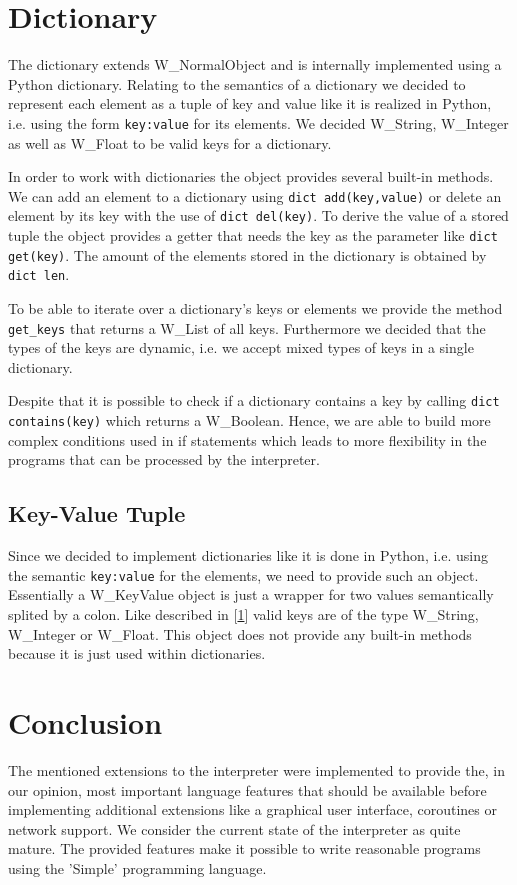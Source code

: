 \documentclass{article}
\begin{document}
\section{Dictionary}
\label{dicts}
The dictionary extends W\_NormalObject and is internally implemented using a Python dictionary.
Relating to the semantics of a dictionary we decided to represent each element as a tuple of key and value like it is realized in Python, i.e. using the form \texttt{key:value} for its elements.
We decided W\_String, W\_Integer as well as W\_Float to be valid keys for a dictionary.

In order to work with dictionaries the object provides several built-in methods.
We can add an element to a dictionary using \texttt{dict add(key,value)} or delete an element by its key with the use of \texttt{dict del(key)}.
To derive the value of a stored tuple the object provides a getter that needs the key as the parameter like \texttt{dict get(key)}.
The amount of the elements stored in the dictionary is obtained by \texttt{dict len}.

To be able to iterate over a dictionary's keys or elements we provide the method \texttt{get\_keys} that returns a W\_List of all keys.
Furthermore we decided that the types of the keys are dynamic, i.e. we accept mixed types of keys in a single dictionary.

Despite that it is possible to check if a dictionary contains a key by calling \texttt{dict contains(key)} which returns a W\_Boolean.
Hence, we are able to build more complex conditions used in if statements which leads to more flexibility in the programs that can be processed by the interpreter.

\subsection{Key-Value Tuple}
Since we decided to implement dictionaries like it is done in Python, i.e. using the semantic \texttt{key:value} for the elements, we need to provide such an object.
Essentially a W\_KeyValue object is just a wrapper for two values semantically splited by a colon.
Like described in [\ref{dicts}] valid keys are of the type W\_String, W\_Integer or W\_Float.
This object does not provide any built-in methods because it is just used within dictionaries.

\section{Conclusion}
The mentioned extensions to the interpreter were implemented to provide the, in our opinion, most important language features that should be available before implementing additional extensions like a graphical user interface, coroutines or network support. We consider the current state of the interpreter as quite mature. The provided features make it possible to write reasonable programs using the 'Simple' programming language.

\newpage
\end{document}
